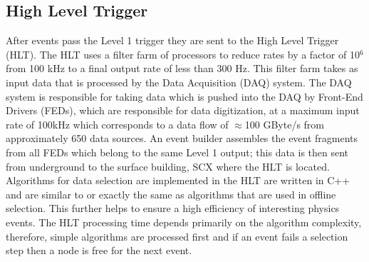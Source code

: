   \subsection{High Level Trigger}
After events pass the Level 1 trigger they are sent to the High Level Trigger (HLT). The
HLT uses a filter farm of processors to reduce rates by a factor of 10$^{6}$ from 
100 kHz to a final output rate of less than 300 Hz. This filter farm takes as input
data that is processed by the Data Acquisition (DAQ) system. The DAQ system is responsible
for taking data which is pushed into the DAQ by Front-End Drivers (FEDs),
which are responsible for data digitization, at a maximum input 
rate of 100kHz which corresponds to a data flow of $\approx$100 GByte/s from approximately
650 data sources. An event builder assembles the event fragments from all FEDs %
which belong to the same Level 1 output; this data is then sent from underground to the surface %
building, SCX where the HLT is located.
Algorithms for data selection are implemented in the HLT are written in
C++ and are similar to or exactly the same as algorithms that are used in offline selection. This 
further helps to ensure a high efficiency of interesting physics events.
The HLT processing time depends primarily on the algorithm complexity,
therefore, simple algorithms are processed first and if an event fails a selection
step then a node is free for the next event.
